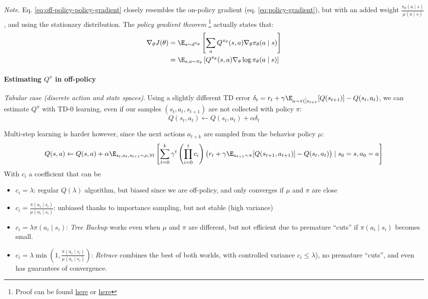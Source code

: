 \emph{Note}. Eq. \ref{eq:off-policy-policy-gradient} closely resembles the on-policy gradient (eq. \ref{eq:policy-gradient}), but with an added weight $\frac{\pi_\theta(a\mid s)}{\mu(a\mid s)}$, and using the stationary distribution. 
The \emph{policy gradient theorem} \footnote{Proof can be found \href{https://lilianweng.github.io/lil-log/2018/04/08/policy-gradient-algorithms.html\#policy-gradient-theorem}{here} or \href{https://stanford.edu/~ashlearn/RLForFinanceBook/PolicyGradient.pdf}{here}} actually states that:
\begin{align}
    \nabla_\theta J(\theta)
    &= \E_{s\sim d^{\pi_\theta}} \left[ \sum_a Q^{\pi_\theta}(s,a) \nabla_\theta \pi_\theta(a\mid s) \right]
    \nonumber \\
    &= \E_{s,a\sim \pi_\theta} \left[ Q^{\pi_\theta}(s,a) \nabla_\theta \log \pi_\theta(a\mid s) \right]
\end{align}

\paragraph{Estimating $Q^\pi$ in off-policy}

\emph{Tabular case (discrete action and state spaces)}.
Using a slightly different TD error $\delta_t = r_t + \gamma \E_{a\sim \pi(\dot \mid s_{t+1}}[Q(s_{t+1})] - Q(s_t,a_t)$, we can estimate $Q^\pi$ with TD-0 learning, even if our samples $(s_t, a_t, s_{t+1})$ are not collected with policy $\pi$:
\[
Q(s_t, a_t) \leftarrow Q(s_t, a_t) + \alpha \delta_t
\]

Multi-step learning is harder however, since the next actions $a_{t+k}$ are sampled from the behavior policy $\mu$:
\[
Q(s, a) \leftarrow Q(s, a) + \alpha \E_{s_t,a_t,s_{t+1} \sim \mu, \forall t} \left[ 
    \sum_{t=0}^k \gamma^t \left( \prod_{i=0}^t c_i \right) \left( 
        r_t + \gamma \E_{a_{t+1}\sim \pi} [Q(s_{t+1}, a_{t+1})] - Q(s_t,a_t)
    \right) \mid s_0 = s, a_0 = a
\right]
\]
With $c_i$ a coefficient that can be
\begin{itemize}
    \item $c_i = \lambda$: regular $Q(\lambda)$ algorithm, but biased since we are off-policy, and only converges if $\mu$ and $\pi$ are close
    \item $c_i = \frac{\pi(a_i\mid s_i)}{\mu(a_i\mid s_i)}$: unbiased thanks to importance sampling, but not stable (high variance)
    \item $c_i = \lambda \pi(a_i\mid s_i)$: \emph{Tree Backup} \cite{precup2000eligibility} works even when $\mu$ and $\pi$ are different, but not efficient due to premature “cuts” if $\pi(a_i\mid s_i)$ becomes small.
    \item $c_i = \lambda \min(1, \frac{\pi(a_i\mid s_i)}{\mu(a_i\mid s_i)})$: \emph{Retrace} \cite{munos2016safe} combines the best of both worlds, with controlled variance $c_i \leq \lambda$), no premature “cuts”, and even has guarantees of convergence.
\end{itemize}

